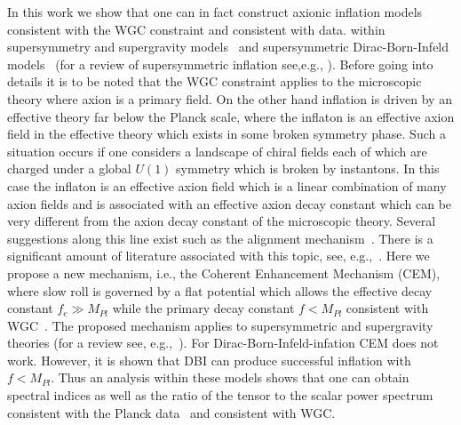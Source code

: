 \documentclass[12pt]{article}
\begin{document}
In this work we show that one can in fact construct axionic inflation models consistent with the WGC constraint and consistent with data.
within supersymmetry and supergravity models~\cite{Nath:2017ihp} and supersymmetric Dirac-Born-Infeld models~\cite{Nath:2018xxe}
(for a review of supersymmetric inflation see,e.g., \cite{Nath:2016qzm}).
Before going into details it is to be noted that the WGC constraint applies to the microscopic theory where axion is a primary field.
On the other hand inflation is driven by an effective theory far below the Planck scale, where the inflaton is an effective axion field in the effective theory which exists in some broken symmetry phase.
Such a situation occurs if one considers a landscape of chiral fields each of which are charged under a global $U\left(1\right)$ symmetry which is broken by instantons.
In this case the inflaton is an effective axion field which is a linear combination of many axion fields and is associated with an effective axion decay constant which can be very different from the axion decay constant of the microscopic theory.
Several suggestions along this line exist such as the alignment mechanism~\cite{Kim:2004rp, Long:2014dta}.
There is a significant amount of literature associated with this topic, see, e.g.,~\cite{Rudelius:2015xta, Rudelius:2014wla, Bachlechner:2014gfa, Choi:2014rja, delaFuente:2014aca, Blumenhagen:2014gta, Hebecker:2015rya, Conlon:2016aea, Montero:2015ofa, Junghans:2015hba}.
Here we propose a new mechanism, i.e., the Coherent Enhancement Mechanism (CEM), where slow roll is governed by a flat potential which allows the effective decay constant $f_e \gg M_{Pl}$ while the primary decay constant $f < M_{Pl}$ consistent with WGC~\cite{Nath:2017ihp}.
The proposed mechanism applies to supersymmetric and supergravity theories (for a review see, e.g.,~\cite{Nath:2016qzm}).
For Dirac-Born-Infeld-infation CEM does not work.
However, it is shown that DBI can produce successful inflation with $f < M_{Pl}$.
Thus an analysis within these models shows that one can obtain spectral indices as well as the ratio of the tensor to the scalar power spectrum consistent with the Planck data~\cite{Akrami:2018vks, Akrami:2018odb, Array:2015xqh} and consistent with WGC.
\end{document}
